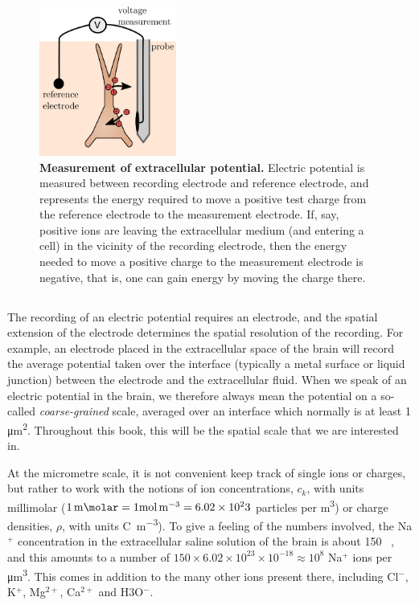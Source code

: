 \begin{figure}[!ht]
\begin{center}
\includegraphics[width=0.4\textwidth]{Figures/Basics/rec_elec_circuit.png}
\end{center}
\caption[]{\textbf{Measurement of extracellular potential.}
Electric potential is measured between recording electrode and reference electrode, and represents the energy required to move a positive test charge from the reference electrode to the measurement electrode. If, say, positive ions are leaving the extracellular medium (and entering a cell) in the vicinity of the recording electrode, then the energy needed to move a positive charge to the measurement electrode is negative, that is, one can gain energy by moving the charge there.  
}
\label{fig:Basics:elec_circuit}
\end{figure}



\subsection{}
\label{sec:Basics:Debye}
The recording of an electric potential requires an electrode, and the spatial extension of the electrode determines the spatial resolution of the recording. For example, an electrode placed in the extracellular space of the brain will record the average potential taken over the interface (typically a metal surface or liquid junction) between the electrode and the extracellular fluid. When we speak of an electric potential in the brain, we therefore always mean the potential on a so-called \textit{coarse-grained} scale, averaged over an interface which normally is at least 1 \si{\square\micro\metre}. Throughout this book, this will be the spatial scale that we are interested in. 

At the micrometre scale, it is not convenient keep track of single ions or charges, but rather to work with the notions of ion concentrations, $c_k$, with units millimolar ($1\, \si{\milli\molar} = 1 \si{\mole\per\cubic\metre} = 6.02\times10^23$ particles per \si{\cubic\metre}) or charge densities, $\rho$, with units \si{\coulomb\per\cubic\metre}). To give a feeling of the numbers involved, the Na$^{+}$ concentration in the extracellular saline solution of the brain is about 150 \si{\milli\molar}, and this amounts to a number of $150\times6.02\times10^{23}\times10^{-18} \approx 10^8$ Na$^{+}$ ions per \si{\cubic\micro\metre}. This comes in addition to the many other ions present there, including Cl$^-$, K$^+$, Mg$^{2+}$, Ca$^{2+}$ and H3O$^{-}$. 

